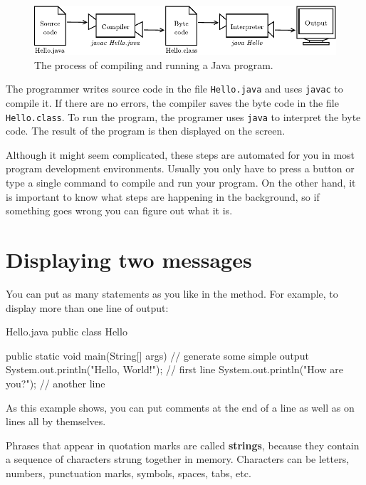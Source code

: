 \begin{figure}[!ht]
\begin{center}
\includegraphics{figs/compiler.pdf}
\caption{The process of compiling and running a Java program.}
\label{fig.compiler}
\end{center}
\end{figure}

The programmer writes source code in the file {\tt Hello.java} and uses {\tt javac} to compile it.
If there are no errors, the compiler saves the byte code in the file {\tt Hello.class}.
To run the program, the programer uses {\tt java} to interpret the byte code.
The result of the program is then displayed on the screen.

Although it might seem complicated, these steps are automated for you in most program development environments.
Usually you only have to press a button or type a single command to compile and run your program.
On the other hand, it is important to know what steps are happening in the background, so if something goes wrong you can figure out what it is.


\section{Displaying two messages}

You can put as many statements as you like in the  method.
For example, to display more than one line of output:

\begin{trinket}[250]{Hello.java}
public class Hello {

    public static void main(String[] args) {
        // generate some simple output
        System.out.println("Hello, World!");  // first line
        System.out.println("How are you?");   // another line
    }
}
\end{trinket}

As this example shows, you can put comments at the end of a line as well as on lines all by themselves.


Phrases that appear in quotation marks are called {\bf strings}, because they contain a sequence of characters strung together in memory.
Characters can be letters, numbers, punctuation marks, symbols, spaces, tabs, etc.

